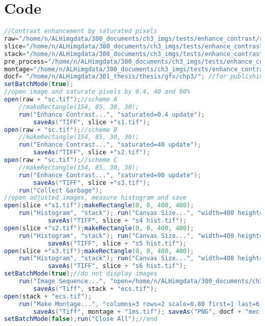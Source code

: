 \chapter{Code}\label{sec:code} 

\begin{lstlisting}[language=java, caption=Saturated pixels examples., label=cd:pre-process-sp]
//Contrast enhancement by saturated pixels
raw="/home/n/ALHimgdata/300_documents/ch3_imgs/tests/enhance_contrast/raw/"; //source and output dir
slice="/home/n/ALHimgdata/300_documents/ch3_imgs/tests/enhance_contrast/slice/"; 
stack="/home/n/ALHimgdata/300_documents/ch3_imgs/tests/enhance_contrast/stack/";
pre_process="/home/n/ALHimgdata/300_documents/ch3_imgs/tests/enhance_contrast/pre_process/";
montage="/home/n/ALHimgdata/300_documents/ch3_imgs/tests/enhance_contrast/montage/";
docf= "/home/n/ALHimgdata/301_thesis/thesis/gfx/chp3/"; //for publishing images
setBatchMode(true);
//open image and saturate pixels by 0.4, 40 and 90%
open(raw + "sc.tif");//scheme A
	//makeRectangle(154, 85, 30, 30);
	run("Enhance Contrast...", "saturated=0.4 update");
		saveAs("TIFF", slice +"s1.tif");
open(raw + "sc.tif");//scheme B
	//makeRectangle(154, 85, 30, 30);
	run("Enhance Contrast...", "saturated=40 update");
		saveAs("TIFF", slice +"s2.tif");
open(raw + "sc.tif");//scheme C
	//makeRectangle(154, 85, 30, 30);
	run("Enhance Contrast...", "saturated=90 update");
		saveAs("TIFF", slice +"s3.tif"); 
	run("Collect Garbage");
//open adjusted images, measure histogram and save
open(slice +"s1.tif");makeRectangle(0, 0, 400, 400);	
	run("Histogram", "stack"); run("Canvas Size...", "width=400 height=400 position=Center zero");
			saveAs("TIFF", slice + "s4 hist.tif"); 
open(slice +"s2.tif");makeRectangle(0, 0, 400, 400);
	run("Histogram", "stack"); run("Canvas Size...", "width=400 height=400 position=Center zero");
			saveAs("TIFF", slice + "s5 hist.tif");	
open(slice +"s3.tif");makeRectangle(0, 0, 400, 400);
	run("Histogram", "stack"); run("Canvas Size...", "width=400 height=400 position=Center zero");
			saveAs("TIFF", slice + "s6 hist.tif"); 			
setBatchMode(true);//do not display images
	run("Image Sequence...", "open=/home/n/ALHimgdata/300_documents/ch3_imgs/tests/enhance_contrast/slice/0_0hist.tif sort");
		saveAs("Tiff", stack + "ecs.tif");	
open(stack + "ecs.tif");
	run("Make Montage...", "columns=3 rows=2 scale=0.80 first=1 last=6 increment=1 border=4 font=20 label use");
		saveAs("Tiff", montage + "1ms.tif"); saveAs("PNG", docf + "mec.png");
setBatchMode(false);run("Close All");//end
\end{lstlisting}

